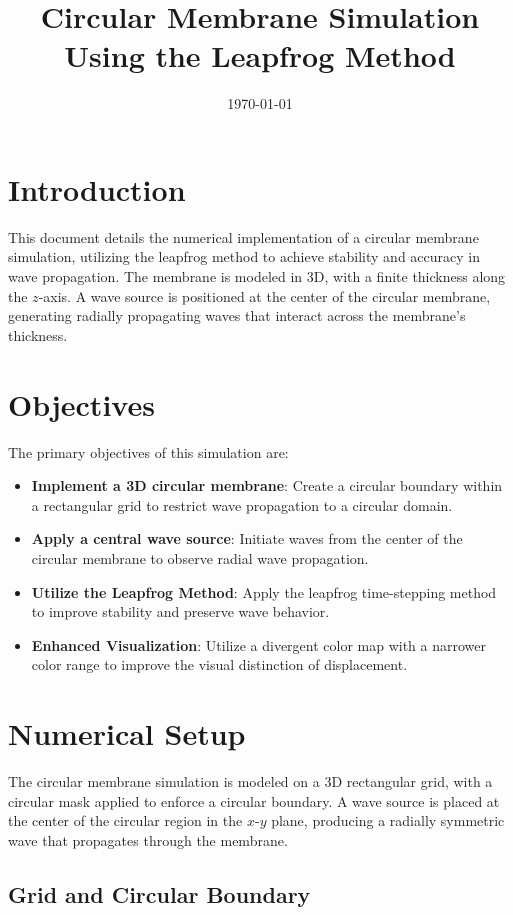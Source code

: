 \documentclass{article}
\title{Circular Membrane Simulation Using the Leapfrog Method}
\author{}
\date{\today}
\begin{document}
\maketitle

\section{Introduction}

This document details the numerical implementation of a circular membrane simulation, utilizing the leapfrog method to achieve stability and accuracy in wave propagation. The membrane is modeled in 3D, with a finite thickness along the $z$-axis. A wave source is positioned at the center of the circular membrane, generating radially propagating waves that interact across the membrane's thickness.

\section{Objectives}

The primary objectives of this simulation are:
\begin{itemize}
    \item \textbf{Implement a 3D circular membrane}: Create a circular boundary within a rectangular grid to restrict wave propagation to a circular domain.
    \item \textbf{Apply a central wave source}: Initiate waves from the center of the circular membrane to observe radial wave propagation.
    \item \textbf{Utilize the Leapfrog Method}: Apply the leapfrog time-stepping method to improve stability and preserve wave behavior.
    \item \textbf{Enhanced Visualization}: Utilize a divergent color map with a narrower color range to improve the visual distinction of displacement.
\end{itemize}

\section{Numerical Setup}

The circular membrane simulation is modeled on a 3D rectangular grid, with a circular mask applied to enforce a circular boundary. A wave source is placed at the center of the circular region in the $x$-$y$ plane, producing a radially symmetric wave that propagates through the membrane.

\subsection{Grid and Circular Boundary}
\end{document}
